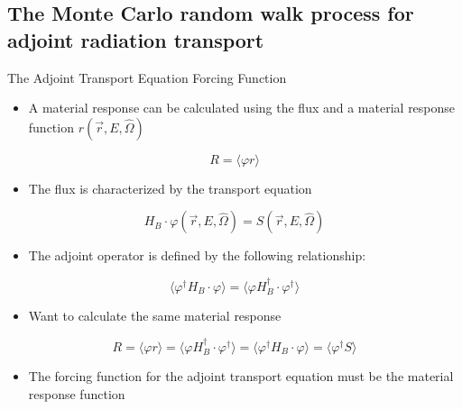 \documentclass{beamer}
\begin{document}
\subsection{The Monte Carlo random walk process for adjoint radiation transport}
\begin{frame}{The Adjoint Transport Equation Forcing Function}

  \begin{itemize}
    \item A material response can be calculated using the flux and a material
      response function $r(\vec{r},E,\hat{\Omega})$
  \end{itemize}
  \begin{equation*}
    R = \langle \varphi r \rangle
  \end{equation*}
  
  \begin{itemize}
    \item The flux is characterized by the transport equation 
  \end{itemize}
  \begin{equation*}
    H_B \cdot \varphi(\vec{r},E,\hat{\Omega}) = S(\vec{r},E,\hat{\Omega})
  \end{equation*}
  
  \begin{itemize}
    \item The adjoint operator is defined by the following relationship:
  \end{itemize}
  \begin{equation*}
    \langle \varphi^{\dagger}H_B \cdot \varphi \rangle = 
    \langle \varphi H_B^{\dagger} \cdot \varphi^{\dagger} \rangle
  \end{equation*}
  
  \begin{itemize}
    \item Want to calculate the same material response
  \end{itemize}
  \medskip
  \begin{equation*}
    R = \langle \varphi r \rangle 
    = \langle \varphi H_B^{\dagger} \cdot \varphi^{\dagger} \rangle 
    = \langle \varphi^{\dagger}H_B \cdot \varphi \rangle
    = \langle \varphi^{\dagger} S \rangle \nonumber
  \end{equation*}

  \begin{itemize}
    \item The forcing function for the adjoint transport equation must be
      the material response function
  \end{itemize}

\end{frame}
\end{document}
